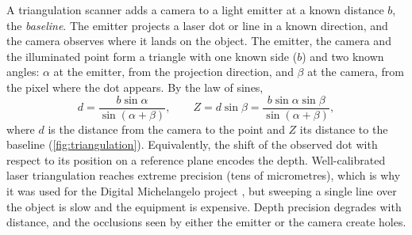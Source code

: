 A triangulation scanner adds a camera to a light emitter at a known distance $b$, the
\emph{baseline}. The emitter projects a laser dot or line in a known direction, and the camera
observes where it lands on the object. The emitter, the camera and the illuminated point form a
triangle with one known side ($b$) and two known angles: $\alpha$ at the emitter, from the
projection direction, and $\beta$ at the camera, from the pixel where the dot appears. By the law
of sines,
\begin{equation}
d=\frac{b\sin\alpha}{\sin(\alpha+\beta)},\qquad Z=d\sin\beta=\frac{b\sin\alpha\sin\beta}{\sin(\alpha+\beta)},
\end{equation}
where $d$ is the distance from the camera to the point and $Z$ its distance to the baseline
(\cref{fig:triangulation}). Equivalently, the shift of the observed dot with respect to its
position on a reference plane encodes the depth. Well-calibrated laser triangulation reaches
extreme precision (tens of micrometres), which is why it was used for the Digital Michelangelo
project \citep{Levoy2000}, but sweeping a single line over the object is slow and the equipment is
expensive. Depth precision degrades with distance, and the occlusions seen by either the emitter or
the camera create holes.

